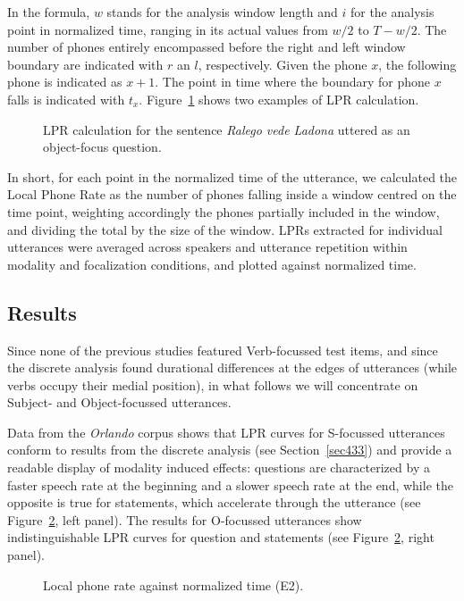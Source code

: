 In the formula, $w$ stands for the analysis window length and $i$ for the analysis point in normalized time, ranging in its actual values from $w/2$ to $T-w/2$. The number of phones entirely encompassed before the right and left window boundary are indicated with $r$ an $l$, respectively. Given the phone $x$, the following phone is indicated as $x+1$. The point in time where the boundary for phone $x$ falls is indicated with $t_{x}$. Figure~\ref{fig403} shows two examples of LPR calculation.

\begin{figure}
\centering
{}
\caption{LPR calculation for the sentence \textit{Ralego vede Ladona} uttered as an object-focus question.}
\label{fig403}\end{figure}

In short, for each point in the normalized time of the utterance, we calculated the Local Phone Rate as the number of phones falling inside a window centred on the time point, weighting accordingly the phones partially included in the window, and dividing the total by the size of the window. LPRs extracted for individual utterances were averaged across speakers and utterance repetition within modality and focalization conditions, and plotted against normalized time.

\subsection{Results}\label{sec443}
Since none of the previous studies featured Verb-focussed test items, and since the discrete analysis found durational differences at the edges of utterances (while verbs occupy their medial position), in what follows we will concentrate on Subject- and Object-focussed utterances.

Data from the \textit{Orlando} corpus shows that LPR curves for S-focussed utterances conform to results from the discrete analysis (see Section~\ref{sec433}) and provide a readable display of modality induced effects: questions are characterized by a faster speech rate at the beginning and a slower speech rate at the end, while the opposite is true for statements, which accelerate through the utterance (see Figure~\ref{fig404}, left panel). The results for O-focussed utterances show indistinguishable LPR curves for question and statements (see Figure~\ref{fig404}, right panel). 

\begin{figure}
\centering
{}
\caption{Local phone rate against normalized time (E2).}
\label{fig404}\end{figure}

